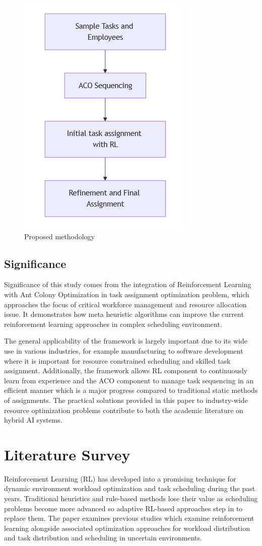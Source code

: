 \documentclass[%
aip,
cp,  %
reprint
]{revtex4-2}
\begin{document}
	\begin{figure}[!hb]
		\centering
		\includegraphics[width=0.3\linewidth]{figures/Initial_flow}
		\caption{\label{fig:flow}Proposed methodology}
	\end{figure}
	
	\subsection{\label{subsec:significance}Significance}
	Significance of this study comes from the integration of Reinforcement Learning
	with Ant Colony Optimization in task assignment optimization problem, which
	approaches the focus of critical workforce management and resource allocation
	issue. It demonstrates how meta heuristic algorithms can improve the current reinforcement
	learning approaches in complex scheduling environment.
	
	The general applicability of the framework is largely important due to its wide
	use in various industries, for example manufacturing to software development
	where it is important for resource constrained scheduling and skilled task
	assignment. Additionally, the framework allows RL component to continuously
	learn from experience and the ACO component to manage task sequencing in an
	efficient manner which is a major progress compared to traditional static
	methods of assignments. The practical solutions provided in this paper to industry-wide
	resource optimization problems contribute to both the academic literature on hybrid
	AI systems.
	
	\section{\label{sec:lit}Literature Survey}
	Reinforcement Learning (RL) has developed into a promising technique for dynamic
	environment workload optimization and task scheduling during the past years.
	Traditional heuristics and rule-based methods lose their value as scheduling
	problems become more advanced so adaptive RL-based approaches step in to
	replace them. The paper examines previous studies which examine reinforcement learning
	alongside associated optimization approaches for workload distribution and task
	distribution and scheduling in uncertain environments.
	
\end{document}
